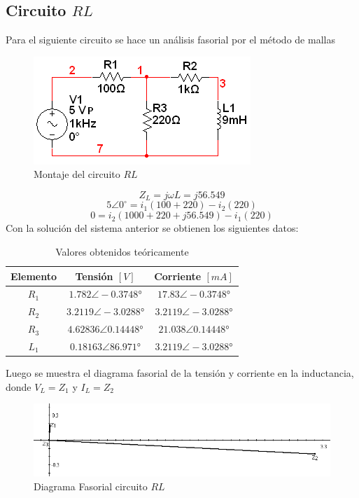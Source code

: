 \documentclass[twocolumn]{IEEEtran}
\begin{document}
\subsection{Circuito $RL$}
\noindent
Para el siguiente circuito se hace un análisis fasorial por el método de mallas
\begin{figure}[H]
	\centering
		\includegraphics[scale=0.75]{circ1.png}
	\caption{Montaje del circuito $RL$}
	\label{fig2}
\end{figure}
\begin{equation}
 {Z_L} = j\omega L = j56.549
\label{ecu1}
\end{equation}
\begin{equation}
 5\angle 0^\circ  = {i_1}(100 + 220) - {i_2}(220)
\label{ecu2}
\end{equation}
\begin{equation}
 0 = {i_2}\left( {1000 + 220 + j56.549} \right) - {i_1}(220)
\label{ecu3}
\end{equation}
\noindent
Con la solución del sistema anterior se obtienen los siguientes datos:
\begin{table}[H]
	\centering
\begin{tabular}[c]{|c|c|c|} \hline
Elemento & Tensión $[V]$ & Corriente $[mA]$ \\ \hline
$R_1$ & $1.782 \angle -0.3748°$ & $17.83 \angle -0.3748°$ \\ \hline
$R_2$ & $3.2119 \angle -3.0288°$ & $3.2119 \angle -3.0288°$ \\ \hline
$R_3$ & $4.62836 \angle 0.14448°$ & $21.038 \angle 0.14448°$ \\ \hline
$L_1$ & $0.18163 \angle 86.971°$ & $3.2119 \angle -3.0288°$ \\ \hline
\end{tabular}
	\caption{Valores obtenidos teóricamente}
	\label{tab1}
\end{table}
\noindent
Luego se muestra el diagrama fasorial de la tensión y corriente en la inductancia, donde $V_L=Z_1$ y $I_L=Z_2$
\begin{figure}[H]
	\centering
		\includegraphics[scale=0.35]{fa1.png}
	\caption{Diagrama Fasorial circuito $RL$}
	\label{fig3}
\end{figure}
\end{document}
